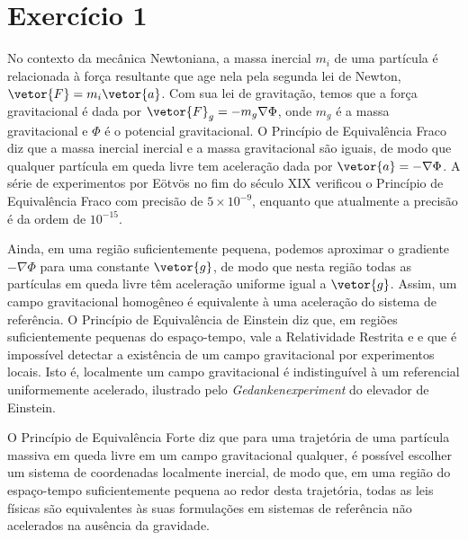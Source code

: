 \section*{Exercício 1}
No contexto da mecânica Newtoniana, a massa inercial \(m_i\) de uma partícula é relacionada à força resultante que age nela pela segunda lei de Newton, \(\vetor{F} = m_i\vetor{a}\). Com sua lei de gravitação, temos que a força gravitacional é dada por \(\vetor{F}_g = -m_g\nabla\Phi\), onde \(m_g\) é a massa gravitacional e \(\Phi\) é o potencial gravitacional. O Princípio de Equivalência Fraco diz que a massa inercial inercial e a massa gravitacional são iguais, de modo que qualquer partícula em queda livre tem aceleração dada por \(\vetor{a} = -\nabla \Phi\). A série de experimentos por Eötvös no fim do século XIX verificou o Princípio de Equivalência Fraco com precisão de \(5\times10^{-9}\), enquanto que atualmente a precisão é da ordem de \(10^{-15}\).

Ainda, em uma região suficientemente pequena, podemos aproximar o gradiente \(-\nabla \Phi\) para uma constante \(\vetor{g}\), de modo que nesta região todas as partículas em queda livre têm aceleração uniforme igual a \(\vetor{g}\). Assim, um campo gravitacional homogêneo é equivalente à uma aceleração do sistema de referência. O Princípio de Equivalência de Einstein diz que, em regiões suficientemente pequenas do espaço-tempo, vale a Relatividade Restrita e e que é impossível detectar a existência de um campo gravitacional por experimentos locais. Isto é, localmente um campo gravitacional é indistinguível à um referencial uniformemente acelerado, ilustrado pelo \textit{Gedankenexperiment} do elevador de Einstein.

O Princípio de Equivalência Forte diz que para uma trajetória de uma partícula massiva em queda livre em um campo gravitacional qualquer, é possível escolher um sistema de coordenadas localmente inercial, de modo que, em uma região do espaço-tempo suficientemente pequena ao redor desta trajetória, todas as leis físicas são equivalentes às suas formulações em sistemas de referência não acelerados na ausência da gravidade.
